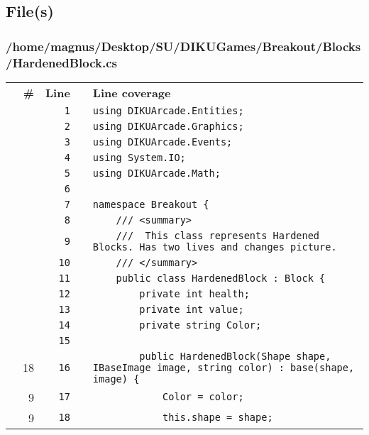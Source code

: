 \documentclass[a4paper,landscape,10pt]{article}
\begin{document}
\subsection{File(s)}
\subsubsection{/home/magnus/Desktop/SU/DIKUGames/Breakout/Blocks/HardenedBlock.cs}
\begin{longtable}[l]{lrrll}
\textbf{} & \textbf{\#} & \textbf{Line} & \textbf{} & \textbf{Line coverage}\\
\cellcolor{gray} &  & \verb~1~ & & \verb~using DIKUArcade.Entities;~\\
\cellcolor{gray} &  & \verb~2~ & & \verb~using DIKUArcade.Graphics;~\\
\cellcolor{gray} &  & \verb~3~ & & \verb~using DIKUArcade.Events;~\\
\cellcolor{gray} &  & \verb~4~ & & \verb~using System.IO;~\\
\cellcolor{gray} &  & \verb~5~ & & \verb~using DIKUArcade.Math;~\\
\cellcolor{gray} &  & \verb~6~ & & \verb~~\\
\cellcolor{gray} &  & \verb~7~ & & \verb~namespace Breakout {~\\
\cellcolor{gray} &  & \verb~8~ & & \verb~    /// <summary>~\\
\cellcolor{gray} &  & \verb~9~ & & \verb~    ///  This class represents Hardened Blocks. Has two lives and changes picture.~\\
\cellcolor{gray} &  & \verb~10~ & & \verb~    /// </summary>~\\
\cellcolor{gray} &  & \verb~11~ & & \verb~    public class HardenedBlock : Block {~\\
\cellcolor{gray} &  & \verb~12~ & & \verb~        private int health;~\\
\cellcolor{gray} &  & \verb~13~ & & \verb~        private int value;~\\
\cellcolor{gray} &  & \verb~14~ & & \verb~        private string Color;~\\
\cellcolor{gray} &  & \verb~15~ & & \verb~~\\
\cellcolor{green} & 18 & \verb~16~ & & \verb~        public HardenedBlock(Shape shape, IBaseImage image, string color) : base(shape, image) {~\\
\cellcolor{green} & 9 & \verb~17~ & & \verb~            Color = color;~\\
\cellcolor{green} & 9 & \verb~18~ & & \verb~            this.shape = shape;~\\

\end{longtable}
\end{document}

